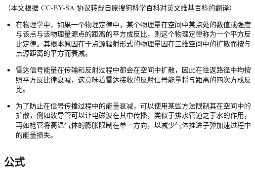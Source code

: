 
（本文根据 CC-BY-SA 协议转载自原搜狗科学百科对英文维基百科的翻译）
\begin{itemize}
\item 在物理学中，如果一个物理定律中，某个物理量在空间中某点处的数值或强度与该点与该物理量源点的距离的平方成反比，则这个物理定律称为一个平方反比定律。其根本原因在于点源辐射形式的物理量因在三维空间中的扩散而按与点源距离的平方而衰减。
\item 雷达信号能量在传输和反射过程中都会在空间中扩散，因此在往返路径中均按照平方反比律衰减，这意味着雷达接收的反射信号能量将与距离的四次方成反比。
\item 为了防止在信号传播过程中的能量衰减，可以使用某些方法限制其在空间中的扩散，例如波导管可以让电磁波在其中传播，类似于排水管道之于水的作用，再如枪管将高温气体的膨胀限制在单一方向，以减少气体推进子弹加速过程中的能量损失。
\end{itemize}
\subsection{公式}

